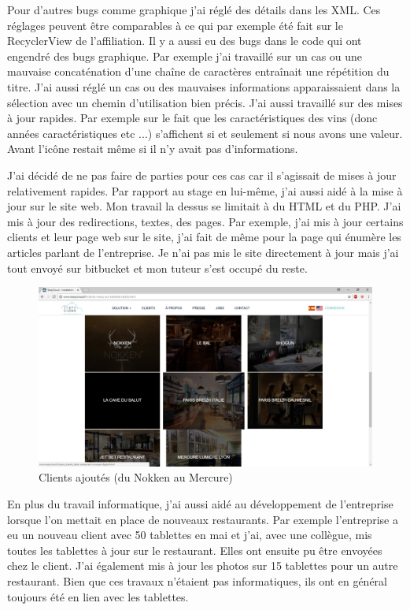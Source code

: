 Pour d'autres bugs comme graphique j'ai réglé des détails dans les XML. Ces réglages peuvent être comparables à ce qui par exemple été fait sur le RecyclerView de l'affiliation. Il y a aussi eu des bugs dans le code qui ont engendré des bugs graphique. Par exemple j'ai travaillé sur un cas ou une mauvaise concaténation d'une chaîne de caractères entraînait une répétition du titre. J'ai aussi réglé un cas ou des mauvaises informations apparaissaient dans la sélection avec un chemin d'utilisation bien précis. J'ai aussi travaillé sur des mises à jour rapides. Par exemple sur le fait que les caractéristiques des vins (donc années caractéristiques etc ...) s'affichent si et seulement si nous avons une valeur. Avant l'icône restait même si il n'y avait pas d'informations.

J'ai décidé de ne pas faire de parties pour ces cas car il s'agissait de mises à jour relativement rapides. Par rapport au stage en lui-même, j'ai aussi aidé à la mise à jour sur le site web. Mon travail la dessus se limitait à du HTML et du PHP. J'ai mis à jour des redirections, textes, des pages. Par exemple, j'ai mis à jour certains clients et leur page web sur le site, j'ai fait de même pour la page qui énumère les articles parlant de l'entreprise. Je n'ai pas mis le site directement à jour mais j'ai tout envoyé sur bitbucket et mon tuteur s'est occupé du reste.

\begin{figure}[!htb]
  \centering
  \includegraphics[width=150mm,scale=0.6]{images/site_web_clients.png}
  \caption{Clients ajoutés (du Nokken au Mercure)}
  \label{fig:boat1}
\end{figure}

En plus du travail informatique, j'ai aussi aidé au développement de l'entreprise lorsque l'on mettait en place de nouveaux restaurants. Par exemple l'entreprise a eu un nouveau client avec 50 tablettes en mai et j'ai, avec une collègue, mis toutes les tablettes à jour sur le restaurant. Elles ont ensuite pu être envoyées chez le client. J'ai également mis à jour les photos sur 15 tablettes pour un autre restaurant. Bien que ces travaux n'étaient pas informatiques, ils ont en général toujours été en lien avec les tablettes.

